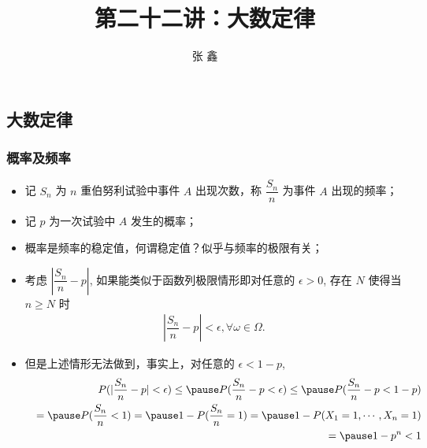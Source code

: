 \documentclass[Prob-All.tex]{subfiles}
\begin{document}
\title[概率论]{第二十二讲：大数定律}
\author[张鑫{\rm Email: x.zhang.seu@foxmail.com} ]{\large 张 鑫}
\date{}


{ 
	\begin{frame}
		\titlepage
	\end{frame}
}

\subsection{大数定律}
\begin{frame}
	\frametitle{概率及频率}
	\begin{itemize}[<+-|alert@+>]
		\item 记 $S_n$ 为 $n$ 重伯努利试验中事件 $A$ 出现次数，称 $\dfrac{S_n}{n}$ 为事件 $A$ 出现的频率；
		\item 记 $p$ 为一次试验中 $A$ 发生的概率；
		\item 概率是频率的稳定值，何谓稳定值？似乎与频率的极限有关；
		\item 考虑 $|\dfrac{S_n}{n}-p|$, 如果能类似于函数列极限情形即对任意的 $\epsilon>0$, 存在 $N$ 使得当 $n\ge N$ 时
		\begin{eqnarray*}
			|\dfrac{S_n}{n}-p|< \epsilon, \forall \omega\in \Omega.
		\end{eqnarray*}
		\item 但是上述情形无法做到，事实上，对任意的 $\epsilon<1-p$,
		\begin{eqnarray*}
			&& P(|\dfrac{S_n}{n}-p|< \epsilon)\le \pause P(\dfrac{S_n}{n}-p<\epsilon)\le \pause P(\dfrac{S_n}{n}-p<1-p)\\
			&&=\pause P(\frac{S_n}{n}<1)=\pause 1-P(\frac{S_n}{n}=1)=\pause 1-P(X_1=1,\cdots,X_n=1)\\
			&&=\pause 1-p^n<1
		\end{eqnarray*}
	\end{itemize}
\end{frame}
\end{document}
